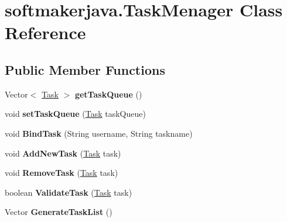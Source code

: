 \hypertarget{classsoftmakerjava_1_1_task_menager}{}\section{softmakerjava.\+Task\+Menager Class Reference}
\label{classsoftmakerjava_1_1_task_menager}
\subsection*{Public Member Functions}
\begin{DoxyCompactItemize}
\item 
Vector$<$ \hyperlink{classsoftmakerjava_1_1_task}{Task} $>$ {\bfseries get\+Task\+Queue} ()\hypertarget{classsoftmakerjava_1_1_task_menager_ae25d4bb98fb417686a589501ed0121f5}{}\label{classsoftmakerjava_1_1_task_menager_ae25d4bb98fb417686a589501ed0121f5}

\item 
void {\bfseries set\+Task\+Queue} (\hyperlink{classsoftmakerjava_1_1_task}{Task} task\+Queue)\hypertarget{classsoftmakerjava_1_1_task_menager_a32477430eeeeb9702075b1255966e4f8}{}\label{classsoftmakerjava_1_1_task_menager_a32477430eeeeb9702075b1255966e4f8}

\item 
void {\bfseries Bind\+Task} (String username, String taskname)\hypertarget{classsoftmakerjava_1_1_task_menager_a6cb52154c2c806c19f37a75779ddc55e}{}\label{classsoftmakerjava_1_1_task_menager_a6cb52154c2c806c19f37a75779ddc55e}

\item 
void {\bfseries Add\+New\+Task} (\hyperlink{classsoftmakerjava_1_1_task}{Task} task)\hypertarget{classsoftmakerjava_1_1_task_menager_aa095af57950e2420097b7445ac635a9b}{}\label{classsoftmakerjava_1_1_task_menager_aa095af57950e2420097b7445ac635a9b}

\item 
void {\bfseries Remove\+Task} (\hyperlink{classsoftmakerjava_1_1_task}{Task} task)\hypertarget{classsoftmakerjava_1_1_task_menager_a9d541a154cfc02fd10ab6c0ec53ba14e}{}\label{classsoftmakerjava_1_1_task_menager_a9d541a154cfc02fd10ab6c0ec53ba14e}

\item 
boolean {\bfseries Validate\+Task} (\hyperlink{classsoftmakerjava_1_1_task}{Task} task)\hypertarget{classsoftmakerjava_1_1_task_menager_af79e2d99c4d18d639fd243f904e9065f}{}\label{classsoftmakerjava_1_1_task_menager_af79e2d99c4d18d639fd243f904e9065f}

\item 
Vector {\bfseries Generate\+Task\+List} ()\hypertarget{classsoftmakerjava_1_1_task_menager_ae2df7d0a47145218a73d03974883cfb9}{}\label{classsoftmakerjava_1_1_task_menager_ae2df7d0a47145218a73d03974883cfb9}

\end{DoxyCompactItemize}
